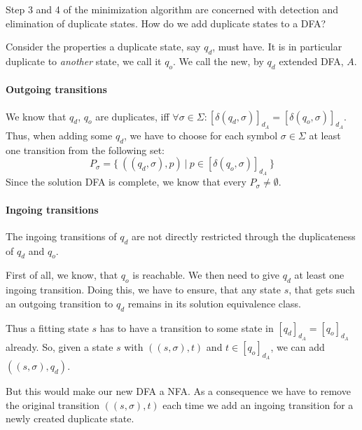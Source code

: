 Step 3 and 4 of the minimization algorithm are concerned with detection and elimination of duplicate states. How do we add duplicate states to a DFA?

Consider the properties a duplicate state, say $q_d$, must have. It is in particular duplicate to \emph{another} state, we call it $q_o$. We call the new, by $q_d$ extended DFA, $A$.


\paragraph*{Outgoing transitions}

We know that $q_d$, $q_o$ are duplicates, iff $\forall \sigma \in \Sigma \colon [\delta(q_d, \sigma)]_{d_A} = [\delta(q_o, \sigma)]_{d_A}$. Thus, when adding some $q_d$, we have to choose for each symbol $\sigma \in \Sigma$ at least one transition from the following set:
\[
	P_\sigma = \{\ ((q_d, \sigma), p)\ |\ p \in [\delta(q_o, \sigma)]_{d_A}\ \}
\]
Since the solution DFA is complete, we know that every $P_\sigma \neq \emptyset$.


\paragraph*{Ingoing transitions}

The ingoing transitions of $q_d$ are not directly restricted through the duplicateness of $q_d$ and $q_o$.

First of all, we know, that $q_o$ is reachable. We then need to give $q_d$ at least one ingoing transition. Doing this, we have to ensure, that any state $s$, that gets such an outgoing transition to $q_d$ remains in its solution equivalence class.
	
Thus a fitting state $s$ has to have a transition to some state in $[q_d]_{d_A} = [q_o]_{d_A}$ already. So, given a state $s$ with $((s, \sigma), t)$ and $t \in [q_o]_{d_A}$, we can add $((s, \sigma), q_d)$.

But this would make our new DFA a NFA. As a consequence we have to remove the original transition $((s, \sigma), t)$ each time we add an ingoing transition for a newly created duplicate state.

